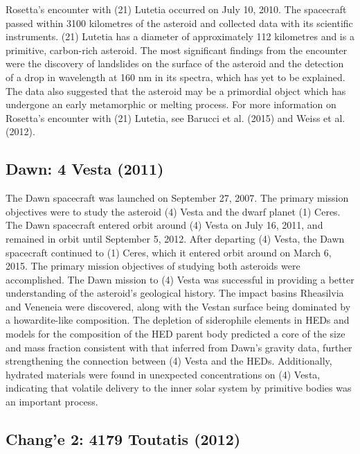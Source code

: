 Rosetta's encounter with (21) Lutetia occurred on July 10, 2010. The spacecraft passed within 3100 kilometres of the asteroid and collected data with its scientific instruments. (21) Lutetia has a diameter of approximately 112 kilometres and is a primitive, carbon-rich asteroid. The most significant findings from the encounter were the discovery of landslides on the surface of the asteroid and the detection of a drop in wavelength at 160 nm in its spectra, which has yet to be explained. The data also suggested that the asteroid may be a primordial object which has undergone an early metamorphic or melting process. For more information on Rosetta's encounter with (21) Lutetia, see Barucci et al. (2015) and Weiss et al. (2012).

\subsection{Dawn: 4 Vesta (2011)}

The Dawn spacecraft was launched on September 27, 2007. The primary mission objectives were to study the asteroid (4) Vesta and the dwarf planet (1) Ceres. The Dawn spacecraft entered orbit around (4) Vesta on July 16, 2011, and remained in orbit until September 5, 2012. After departing (4) Vesta, the Dawn spacecraft continued to (1) Ceres, which it entered orbit around on March 6, 2015. The primary mission objectives of studying both asteroids were accomplished. The Dawn mission to (4) Vesta was successful in providing a better understanding of the asteroid's geological history. The impact basins Rheasilvia and Veneneia were discovered, along with the Vestan surface being dominated by a howardite-like composition. The depletion of siderophile elements in \glspl{HED} and models for the composition of the \gls{HED} parent body predicted a core of the size and mass fraction consistent with that inferred from Dawn's gravity data, further strengthening the connection between (4) Vesta and the \glspl{HED}. Additionally, hydrated materials were found in unexpected concentrations on (4) Vesta, indicating that volatile delivery to the inner solar system by primitive bodies was an important process.

\subsection{Chang'e 2: 4179 Toutatis (2012)}

